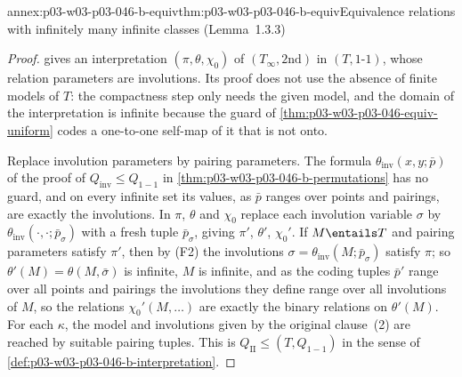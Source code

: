 \begin{annexitem}{annex:p03-w03-p03-046-b-equiv}{thm:p03-w03-p03-046-b-equiv}{Equivalence relations with infinitely many infinite classes (Lemma~1.3.3)}
\begin{proof}
 gives an interpretation
\((\pi,\theta,\chi_0)\) of \((T_\infty,\mathrm{2nd})\) in \((T,\text{1-1})\),
whose relation parameters are involutions. Its proof does not use the
absence of finite models of \(T\): the compactness step only needs the
given model, and the domain of the interpretation is infinite because the
guard of \cref{thm:p03-w03-p03-046-equiv-uniform} codes a one-to-one
self-map of it that is not onto.

Replace involution parameters by pairing parameters. The formula
\(\theta_{\mathrm{inv}}(x,y;\bar p)\) of the proof of
\(Q_{\mathrm{inv}}\le Q_{1-1}\) in
\cref{thm:p03-w03-p03-046-b-permutations} has no guard, and on every
infinite set its values, as \(\bar p\) ranges over points and pairings,
are exactly the involutions. In \(\pi\), \(\theta\) and \(\chi_0\) replace
each involution variable \(\sigma\) by \(\theta_{\mathrm{inv}}(\cdot,\cdot;\bar
p_\sigma)\) with a fresh tuple \(\bar p_\sigma\), giving \(\pi'\),
\(\theta'\), \(\chi_0'\). If \(M\entails T\) and pairing parameters satisfy
\(\pi'\), then by (F2) the involutions \(\sigma=\theta_{\mathrm{inv}}(M;\bar
p_\sigma)\) satisfy \(\pi\); so \(\theta'(M)=\theta(M,\bar\sigma)\) is
infinite, \(M\) is infinite, and as the coding tuples \(\bar p'\) range
over all points and pairings the involutions they define range over all
involutions of \(M\), so the relations \(\chi_0'(M,\dots)\) are exactly
the binary relations on \(\theta'(M)\). For each \(\kappa\), the model and
involutions given by the original clause~(2) are reached by suitable
pairing tuples. This is \(Q_{\mathrm{II}}\le(T,Q_{1-1})\) in the sense of
\cref{def:p03-w03-p03-046-b-interpretation}.
\end{proof}
\end{annexitem}
